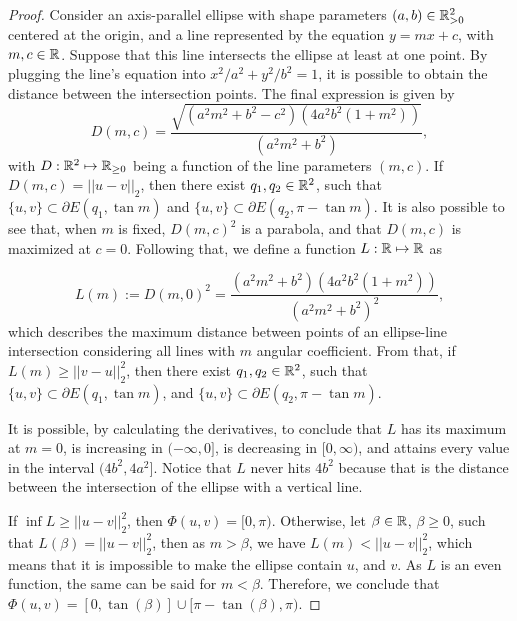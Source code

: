 \begin{proof}
	
	Consider an axis-parallel ellipse with shape parameters $(a, b)\in\mathbb{R}^2_{>0}$ centered at the origin, and a line represented by the equation $y=mx+c$, with $m, c\in \mathbb{R}$. Suppose that this line intersects the ellipse at least at one point. By plugging the line's equation into $x^2/a^2+y^2/b^2=1$, it is possible to obtain the distance between the intersection points. The final expression is given by
	\begin{equation*}\label{eq:dist_line_ellipse}
	D(m, c)=\dfrac{\sqrt{(a^2m^2+b^2-c^2)(4a^2b^2(1+m^2))}}{(a^2m^2+b^2)},
	\end{equation*}
	with $D : \mathbb{R}^2 \mapsto \mathbb{R}_{\ge0}$ being a function of the line parameters $(m, c)$.
	If $D(m, c) = ||u-v||_2$, then there exist $q_1, q_2 \in \mathbb{R}^2$, such that $\{u, v\} \subset \partial E(q_1, \tan{m})$ and $\{u, v\} \subset \partial E(q_2, \pi-\tan{m})$. It is also possible to see that, when $m$ is fixed, $D(m, c)^2$ is a parabola, and that $D(m, c)$ is maximized at $c=0$.  
	Following that, we define a function $L:\mathbb{R}\mapsto\mathbb{R}$ as
	
	\begin{equation*}
	L(m):= D(m, 0)^2 = \dfrac{(a^2m^2+b^2)(4a^2b^2(1+m^2))}{(a^2m^2+b^2)^2},
	\end{equation*}
	which describes the maximum distance between points of an ellipse-line intersection considering all lines with $m$ angular coefficient. From that, if $L(m) \ge ||v-u||_2^2$, then there exist $q_1, q_2\in\mathbb{R}^2$, such that $\{u, v\} \subset \partial E(q_1, \tan{m})$, and $\{u, v\} \subset \partial E(q_2, \pi-\tan{m})$.
	
	It is possible, by calculating the derivatives, to conclude that $L$ has its maximum at $m=0$, is increasing in $(-\infty, 0]$, is decreasing in $[0, \infty)$, and attains every value in the interval $(4b^2, 4a^2]$. Notice that $L$ never hits $4b^2$ because that is the distance between the intersection of the ellipse with a vertical line.
	
	If $\inf{L} \ge ||u-v||_2^2$, then $\Phi(u,v) = [0, \pi)$.
	Otherwise, let $\beta \in \mathbb{R}$, $\beta \ge 0$, such that $L(\beta) = ||u-v||_2^2$, then as $m>\beta$, we have $L(m) < ||u-v||_2^2$, which means that it is impossible to make the ellipse contain $u$, and $v$.
	As $L$ is an even function, the same can be said for $m < \beta$. Therefore, we conclude that $\Phi(u,v)=[0, \tan(\beta)] \cup [\pi-\tan(\beta), \pi)$.
\end{proof}



